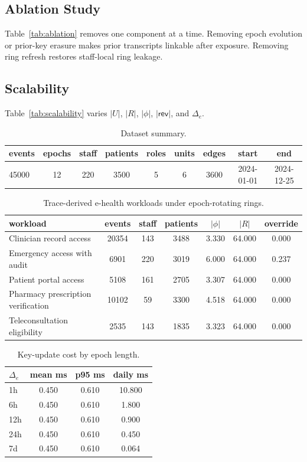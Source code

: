 \subsection{Ablation Study}
Table~\ref{tab:ablation} removes one component at a time. Removing epoch evolution or prior-key erasure makes prior transcripts linkable after exposure. Removing ring refresh restores staff-local ring leakage.

\subsection{Scalability}
Table~\ref{tab:scalability} varies $|U|$, $|R|$, $|\phi|$, $|\mathsf{rev}|$, and $\Delta_e$.


\begin{table}[t]
\centering
\caption{Dataset summary.}
\label{tab:dataset-summary}
\begin{tabular}{@{}lcccccccc@{}}
\toprule
events & epochs & staff & patients & roles & units & edges & start & end \\
\midrule
45000 & 12 & 220 & 3500 & 5 & 6 & 3600 & 2024-01-01 & 2024-12-25 \\
\bottomrule
\end{tabular}
\end{table}

\begin{table}[t]
\centering
\caption{Trace-derived e-health workloads under epoch-rotating rings.}
\label{tab:ehealth-workloads}
\begin{tabular}{@{}lcccccc@{}}
\toprule
workload & events & staff & patients & $|\phi|$ & $|R|$ & override \\
\midrule
Clinician record access & 20354 & 143 & 3488 & 3.330 & 64.000 & 0.000 \\
Emergency access with audit & 6901 & 220 & 3019 & 6.000 & 64.000 & 0.237 \\
Patient portal access & 5108 & 161 & 2705 & 3.307 & 64.000 & 0.000 \\
Pharmacy prescription verification & 10102 & 59 & 3300 & 4.518 & 64.000 & 0.000 \\
Teleconsultation eligibility & 2535 & 143 & 1835 & 3.323 & 64.000 & 0.000 \\
\bottomrule
\end{tabular}
\end{table}

\begin{table}[t]
\centering
\caption{Key-update cost by epoch length.}
\label{tab:key-update}
\begin{tabular}{@{}lccc@{}}
\toprule
$\Delta_e$ & mean ms & p95 ms & daily ms \\
\midrule
1h & 0.450 & 0.610 & 10.800 \\
6h & 0.450 & 0.610 & 1.800 \\
12h & 0.450 & 0.610 & 0.900 \\
24h & 0.450 & 0.610 & 0.450 \\
7d & 0.450 & 0.610 & 0.064 \\
\bottomrule
\end{tabular}
\end{table}

